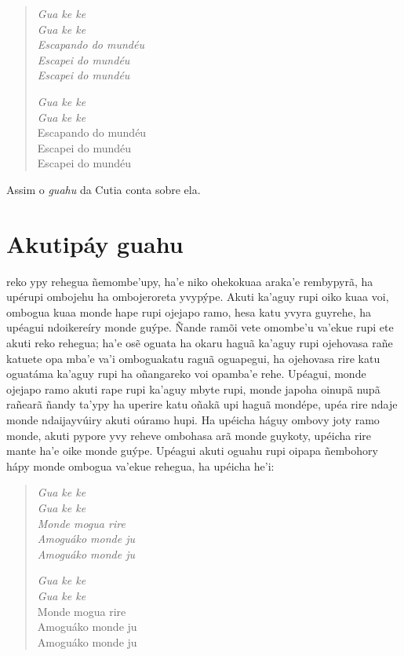 \begin{verse}
\itshape
\emph{Gua ke ke}\\
\emph{Gua ke ke}\\
Escapando do mundéu\\
Escapei do mundéu\\
Escapei do mundéu

\emph{Gua ke ke}\\
\emph{Gua ke ke}\\
Escapando do mundéu\\
Escapei do mundéu\\
Escapei do mundéu  
\end{verse}

Assim o \emph{guahu} da Cutia conta sobre ela.

\chapter{Akutipáy guahu}
\vspace*{-1\baselineskip}

 reko ypy rehegua ñemombe'upy, ha'e niko ohekokuaa araka'e
rembypyrã, ha upérupi ombojehu ha ombojeroreta yvypýpe. Akuti ka'aguy
rupi oiko kuaa voi, ombogua kuaa monde hape rupi ojejapo ramo, hesa katu
yvyra guyrehe, ha upéagui ndoikereíry monde guýpe. Ñande ramõi vete
omombe'u va'ekue rupi ete akuti reko rehegua; ha'e osẽ oguata ha okaru
haguã ka'aguy rupi ojehovasa rañe katuete opa mba'e va'i omboguakatu
raguã oguapegui, ha ojehovasa rire katu oguatáma ka'aguy rupi ha
oñangareko voi opamba'e rehe. Upéagui, monde ojejapo ramo akuti rape
rupi ka'aguy mbyte rupi, monde japoha oinupã nupã rañearã ñandy ta'ypy
ha uperire katu oñakã upi haguã mondépe, upéa rire ndaje monde
ndaijayvúiry akuti oúramo hupi. Ha upéicha háguy ombovy joty ramo monde,
akuti pypore yvy reheve ombohasa arã monde guykoty, upéicha rire mante
ha'e oike monde guýpe. Upéagui akuti oguahu rupi oipapa ñembohory hápy
monde ombogua va'ekue rehegua, ha upéicha he'i:

\begin{verse}
\itshape
\emph{Gua ke ke}\\
\emph{Gua ke ke}\\
Monde mogua rire\\
Amoguáko monde ju\\
Amoguáko monde ju
       
\emph{Gua ke ke}\\
\emph{Gua ke ke}\\
Monde mogua rire\\
Amoguáko monde ju\\ \EP[2]
Amoguáko monde ju 
\end{verse}

